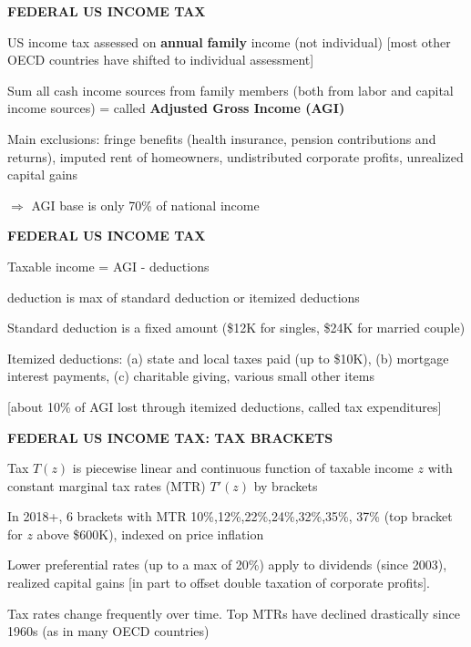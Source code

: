 \documentclass[landscape]{slides}
\begin{document}
\begin{slide}
\begin{center}
{\bf FEDERAL US INCOME TAX}
\end{center}

US income tax assessed on {\bf annual} {\bf family} income (not
individual) [most other OECD countries have shifted to individual
assessment]

Sum all cash income sources from family members (both from labor
and capital income sources) = called {\bf Adjusted Gross Income
(AGI)}

Main exclusions: fringe benefits (health insurance, pension
contributions and returns), imputed rent of homeowners, undistributed corporate profits, unrealized capital gains

$\Rightarrow$ AGI base is only 70\% of national income

\end{slide}


\begin{slide}
\begin{center}
{\bf FEDERAL US INCOME TAX}
\end{center}

Taxable income = AGI - deductions


deduction is max of standard deduction or itemized deductions

Standard deduction is a fixed amount 
(\$12K for singles, \$24K for married couple)

Itemized deductions: (a) state and local taxes paid (up to \$10K), (b) mortgage interest payments, (c) charitable giving,  various small other items

[about 10\% of AGI lost through itemized deductions, called tax
expenditures]

\end{slide}


\begin{slide}
\begin{center}
{\bf FEDERAL US INCOME TAX: TAX BRACKETS}
\end{center}

Tax $T(z)$ is piecewise linear and continuous function of taxable
income $z$ with constant marginal tax rates (MTR) $T'(z)$ by
brackets

In 2018+, 6 brackets with MTR 10\%,12\%,22\%,24\%,32\%,35\%, 37\% (top
bracket for $z$ above \$600K), indexed on price inflation

Lower preferential rates (up to a max of 20\%) apply to dividends
(since 2003), realized capital gains [in part to offset double
taxation of corporate profits].


Tax rates change frequently over time. Top MTRs have declined
drastically since 1960s (as in many OECD countries)
\end{slide}
\end{document}
